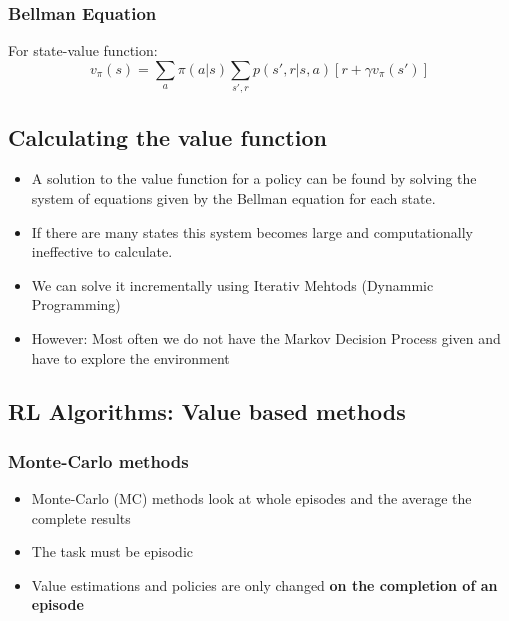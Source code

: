 \subsubsection{Bellman Equation}
For state-value function:
\[
v_\pi(s) = \sum_a \pi(a|s) \sum_{s', r} p(s', r | s, a) [r + \gamma v_\pi(s')]
\]
\subsection{Calculating the value function}
\begin{itemize}
    \item A solution to the value function for a policy can be found by solving the system of equations given by the Bellman equation for each state.
    \item If there are many states this system becomes large and computationally ineffective to calculate.
    \item We can solve it incrementally using Iterativ Mehtods (Dynammic Programming)
    \item However: Most often we do not have the Markov Decision Process given and have to explore the environment
\end{itemize}

\subsection{RL Algorithms: Value based methods}
\subsubsection{Monte-Carlo methods}
\begin{itemize}
    \item Monte-Carlo (MC) methods look at whole episodes and the average the complete results
    \item The task must be episodic
    \item Value estimations and policies are only changed \textbf{on the completion of an episode}
\end{itemize}

